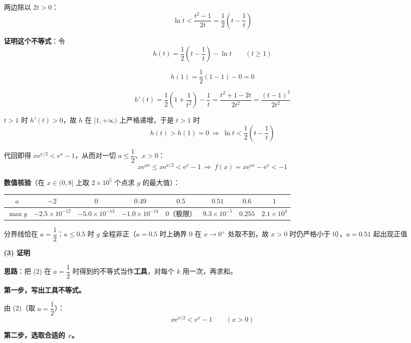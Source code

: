 \begin{answer}
两边除以 $2t>0$：
\nopagebreak[4]
\[\ln t<\frac{t^{2}-1}{2t}=\frac12\left(t-\frac1t\right)\]

\textbf{证明这个不等式}：令
\nopagebreak[4]
\[h(t)=\frac12\left(t-\frac1t\right)-\ln t\qquad(t\ge1)\]

\nopagebreak[4]
\[h(1)=\frac12(1-1)-0=0\]

\nopagebreak[4]
\[h'(t)=\frac12\left(1+\frac1{t^{2}}\right)-\frac1t=\frac{t^{2}+1-2t}{2t^{2}}=\frac{(t-1)^{2}}{2t^{2}}\]

$t>1$ 时 $h'(t)>0$，故 $h$ 在 $[1,+\infty)$ 上严格递增，于是 $t>1$ 时
\nopagebreak[4]
\[h(t)>h(1)=0\ \Longrightarrow\ \ln t<\frac12\left(t-\frac1t\right)\]

代回即得 $x\mathrm e^{x/2}<\mathrm e^{x}-1$，从而对一切 $a\le\dfrac12$、$x>0$：
\nopagebreak[4]
\[x\mathrm e^{ax}\le x\mathrm e^{x/2}<\mathrm e^{x}-1\ \Longrightarrow\ f(x)=x\mathrm e^{ax}-\mathrm e^{x}<-1\]

\textbf{数值核验}（在 $x\in(0,8]$ 上取 $2\times10^{5}$ 个点求 $g$ 的最大值）：

\begin{center}
\begingroup\setlength{\tabcolsep}{4pt}
\begin{tabular}{cccccccc}
\toprule
$a$ & $-2$ & $0$ & $0.49$ & $0.5$ & $0.51$ & $0.6$ & $1$ \\
\midrule
$\max g$ & $-2.5\times10^{-12}$ & $-5.0\times10^{-13}$ & $-1.0\times10^{-14}$ & $0$（极限） & $9.3\times10^{-5}$ & $0.255$ & $2.1\times10^{4}$ \\
\bottomrule
\end{tabular}
\endgroup
\end{center}

分界线恰在 $a=\dfrac12$：$a\le0.5$ 时 $g$ 全程非正（$a=0.5$ 时上确界 $0$ 在 $x\to0^{+}$ 处取不到，故 $x>0$ 时仍严格小于 $0$），$a=0.51$ 起出现正值 

\par\medskip

\textbf{(3) 证明}

\textbf{思路}：把 (2) 在 $a=\dfrac12$ 时得到的不等式当作\textbf{工具}，对每个 $k$ 用一次，再求和。

\textbf{第一步，写出工具不等式。}

由 (2)（取 $a=\dfrac12$）：
\nopagebreak[4]
\[x\mathrm e^{x/2}<\mathrm e^{x}-1\qquad(x>0)\]

\textbf{第二步，选取合适的 $x$。}


\end{answer}
